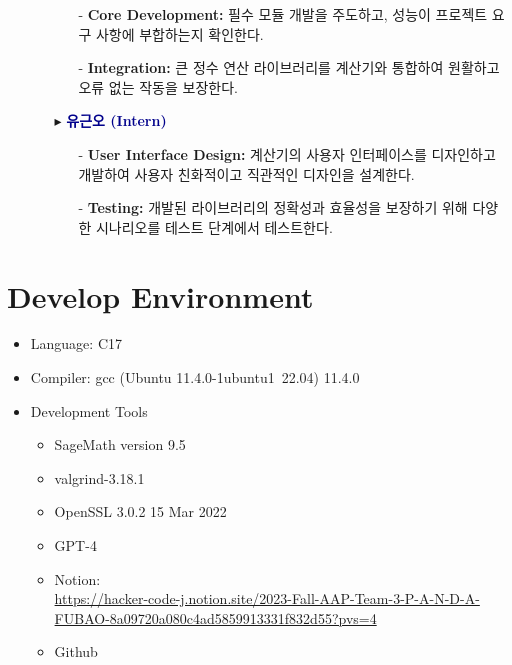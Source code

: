 \documentclass[12pt,a4paper]{article}
\begin{document}
\begin{itemize}
\begin{itemize}
\begin{itemize}
			\item[-] \textbf{Core Development:} 필수 모듈 개발을 주도하고, 성능이 프로젝트 요구 사항에 부합하는지 확인한다.
			\item[-] \textbf{Integration:} 큰 정수 연산 라이브러리를 계산기와 통합하여 원활하고 오류 없는 작동을 보장한다.
		\end{itemize}
		\vspace{5pt}
			\item[$\blacktriangleright$] \textcolor{darkblue}{\bf 유근오 (Intern)}
		\begin{itemize}
			\item[-] \textbf{User Interface Design:} 계산기의 사용자 인터페이스를 디자인하고 개발하여 사용자 친화적이고 직관적인 디자인을 설계한다.
			\item[-] \textbf{Testing:} 개발된 라이브러리의 정확성과 효율성을 보장하기 위해 다양한 시나리오를 테스트 단계에서 테스트한다. 
		\end{itemize}
		\end{itemize}
	\end{itemize}
	
	\section{Develop Environment}
	\begin{itemize}
		\item Language: C17
		\item Compiler: gcc (Ubuntu 11.4.0-1ubuntu1~22.04) 11.4.0
		\item Development Tools
		\begin{itemize}
			\item SageMath version 9.5
			\item valgrind-3.18.1
			\item OpenSSL 3.0.2 15 Mar 2022
			\item GPT-4
			\item Notion:\\ \url{https://hacker-code-j.notion.site/2023-Fall-AAP-Team-3-P-A-N-D-A-FUBAO-8a09720a080c4ad5859913331f832d55?pvs=4}
			\item Github
		\end{itemize}
	\end{itemize}
	
	\newpage
\end{document}
